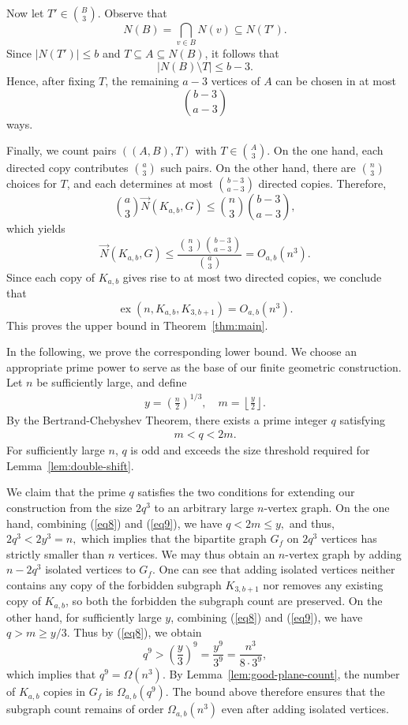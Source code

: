 \documentclass[11pt,a4paper]{article}
\theoremstyle{definition}
\theoremstyle{remark}
\newcommand{\ex}{\operatorname{ex}}
\begin{document}
Now let $T'\in\binom{B}{3}$. Observe that
\[
N(B)=\bigcap_{v\in B}N(v)\subseteq N(T').
\]
Since $|N(T')|\le b$ and $T\subseteq A\subseteq N(B)$, it follows that
\[
|N(B)\setminus T|\le b-3.
\]
Hence, after fixing $T$, the remaining $a-3$ vertices of $A$ can be chosen in at most
\[
\binom{b-3}{a-3}
\]
ways.

Finally, we count pairs $((A,B),T)$ with $T\in\binom{A}{3}$. On the one hand, each directed
copy contributes $\binom{a}{3}$ such pairs. On the other hand, there are $\binom{n}{3}$ choices
for $T$, and each determines at most $\binom{b-3}{a-3}$ directed copies. Therefore,
\[
\binom{a}{3}\vec{N}(K_{a,b},G)
\le
\binom{n}{3}\binom{b-3}{a-3},
\]
which yields
\[
\vec{N}(K_{a,b},G)
\le
\frac{\binom{n}{3}\binom{b-3}{a-3}}{\binom{a}{3}}
=
O_{a,b}(n^3).
\]
Since each copy of $K_{a,b}$ gives rise to at most two directed copies, we conclude that
\[
\ex(n,K_{a,b},K_{3,b+1})=O_{a,b}(n^3).
\]
This proves the upper bound in Theorem~\ref{thm:main}.


In the following, we prove the corresponding lower bound.
We choose an appropriate prime power to serve as the base of our finite geometric construction. Let $n$ be sufficiently large, and define
\begin{align}\label{eq8}
   y = \left(\frac{n}{2}\right)^{1/3}, \quad m = \left\lfloor \frac{y}{2} \right\rfloor. 
\end{align}
By the Bertrand-Chebyshev Theorem, 
there exists a prime integer $q$ satisfying 
\begin{align}\label{eq9}
  m<q<2m. 
\end{align}
For sufficiently large $n$, $q$ is odd and exceeds the size threshold required for Lemma~\ref{lem:double-shift}. 

We claim that the prime $q$ satisfies the two conditions for extending our construction from the  size $2q^3$ to an arbitrary large $n$-vertex graph.
On the one hand, combining (\ref{eq8}) and (\ref{eq9}), we have
$
q < 2m \leq y,
$
and thus,
$
2q^3 < 2y^3 = n,
$
which implies that the bipartite graph $G_f$ on $2q^3$ vertices has strictly smaller than $n$ vertices. We may thus obtain an $n$-vertex graph by adding $n - 2q^3$ isolated vertices to $G_f$. One can see that adding isolated vertices neither contains any copy of the forbidden subgraph $K_{3,b+1}$ nor removes any existing copy of $K_{a,b}$, so both the forbidden the subgraph count are preserved.
On the other hand, for sufficiently large $y$, combining (\ref{eq8}) and (\ref{eq9}), we have $q>m\geq y/3$. Thus by (\ref{eq8}),
we obtain
\[
q^9 > \left(\frac{y}{3}\right)^9 = \frac{y^9}{3^9} = \frac{n^3}{8 \cdot 3^9},
\]
which implies that $q^9 = \Omega(n^3)$.
By Lemma~\ref{lem:good-plane-count}, the number of $K_{a,b}$ copies in $G_f$ is $\Omega_{a,b}(q^9)$. The bound above therefore ensures that the subgraph count remains of order $\Omega_{a,b}(n^3)$ even after adding  isolated vertices.
\end{document}
